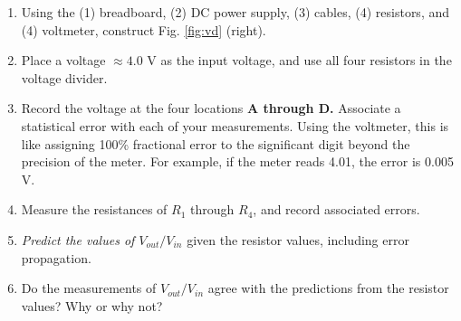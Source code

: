\documentclass[12pt]{article}
\begin{document}
\begin{enumerate}
\item Using the (1) breadboard, (2) DC power supply, (3) cables, (4) resistors, and (4) voltmeter, construct Fig. \ref{fig:vd} (right).
\item Place a voltage $\approx 4.0$ V as the input voltage, and use all four resistors in the voltage divider.
\item Record the voltage at the four locations \textbf{A through D.}  Associate a statistical error with each of your measurements.  Using the voltmeter, this is like assigning 100\% fractional error to the significant digit beyond the precision of the meter.  For example, if the meter reads 4.01, the error is 0.005 V.
\item Measure the resistances of $R_1$ through $R_4$, and record associated errors.
\item \textit{Predict the values of $V_{out}/V_{in}$} given the resistor values, including error propagation.
\item Do the measurements of $V_{out}/V_{in}$ agree with the predictions from the resistor values?  Why or why not?
\end{enumerate}
\end{document}
